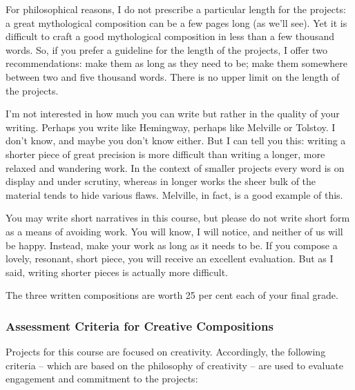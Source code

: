 \documentclass[letterpaper,10pt,headsepline]{scrreprt}
\begin{document}
For philosophical reasons, I do not prescribe a particular length for the projects: a great mythological composition can be a few pages long (as we'll see). Yet it is difficult to craft a good mythological composition in less than a few thousand words. So, if you prefer a guideline for the length of the projects, I offer two recommendations: make them as long as they need to be; make them somewhere between two and five thousand words. There is no upper limit on the length of the projects.

I'm not interested in how much you can write but rather in the quality of your writing. Perhaps you write like Hemingway, perhaps like
Melville or Tolstoy. I don't know, and maybe you don't know either. But I can tell you this: writing a shorter piece of great precision is
more difficult than writing a longer, more relaxed and wandering work. In the context of smaller projects every word is on display and under
scrutiny, whereas in longer works the sheer bulk of the material tends to hide various flaws. Melville, in fact, is a good example of this.

You may write short narratives in this course, but please do not write short form as a means of avoiding work. You will know, I will notice,
and neither of us will be happy. Instead, make your work as long as it needs to be. If you compose a lovely, resonant, short piece, you will
receive an excellent evaluation. But as I said, writing shorter pieces is actually more difficult.

The three written compositions are worth 25 per cent each of your final grade.

\subsubsection{Assessment Criteria for Creative Compositions}

Projects for this course are focused on creativity. Accordingly, the following criteria -- which are based on the philosophy of creativity  --  are used to evaluate engagement and commitment to the projects:
\end{document}
